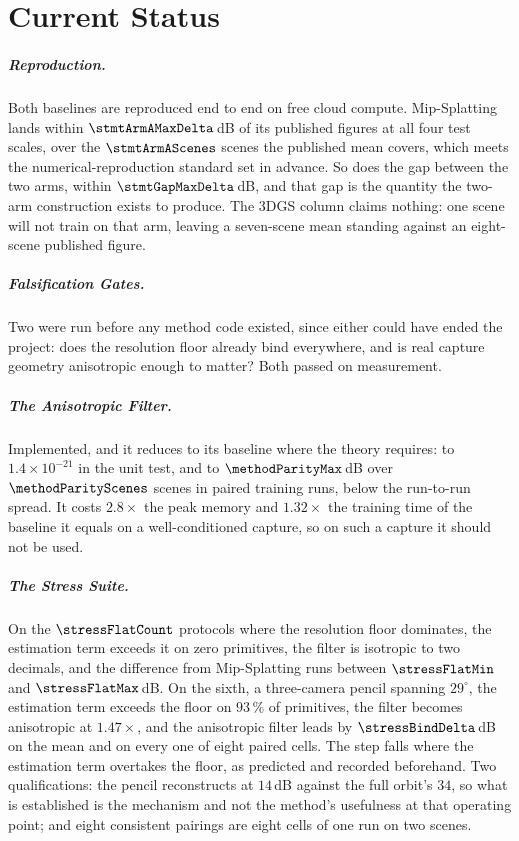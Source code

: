 \chapter*{Current Status}

\paragraph{Reproduction.} Both baselines are reproduced end to end on free cloud
compute. Mip-Splatting lands within $\stmtArmAMaxDelta$\,dB of its published
figures at all four test scales, over the $\stmtArmAScenes$ scenes the published
mean covers, which meets the numerical-reproduction standard set in advance. So
does the gap between the two arms, within $\stmtGapMaxDelta$\,dB, and that gap
is the quantity the two-arm construction exists to produce. The 3DGS column
claims nothing: one scene will not train on that arm, leaving a seven-scene mean
standing against an eight-scene published figure.

\paragraph{Falsification Gates.} Two were run before any method code existed,
since either could have ended the project: does the resolution floor already
bind everywhere, and is real capture geometry anisotropic enough to matter? Both
passed on measurement.

\paragraph{The Anisotropic Filter.} Implemented, and it reduces to its baseline
where the theory requires: to $1.4\times10^{-21}$ in the unit test, and to
$\methodParityMax$\,dB over $\methodParityScenes$ scenes in paired training
runs, below the run-to-run spread. It costs $2.8\times$ the peak memory and
$1.32\times$ the training time of the baseline it equals on a well-conditioned
capture, so on such a capture it should not be used.

\paragraph{The Stress Suite.} On the $\stressFlatCount$ protocols where the
resolution floor dominates, the estimation term exceeds it on zero primitives,
the filter is isotropic to two decimals, and the difference from Mip-Splatting
runs between $\stressFlatMin$ and $\stressFlatMax$\,dB. On the sixth, a
three-camera pencil spanning $29^\circ$, the estimation term exceeds the floor
on $93\,\%$ of primitives, the filter becomes anisotropic at $1.47\times$, and
the anisotropic filter leads by $\stressBindDelta$\,dB on the mean and on every
one of eight paired cells. The step falls where the estimation term overtakes
the floor, as predicted and recorded beforehand. Two qualifications: the pencil
reconstructs at $14$\,dB against the full orbit's $34$, so what is established is
the mechanism and not the method's usefulness at that operating point; and eight
consistent pairings are eight cells of one run on two scenes.

